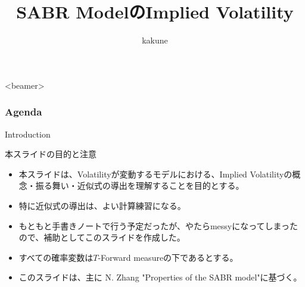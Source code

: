 \documentclass[dvipdfmx,9pt]{beamer}
\title{SABR ModelのImplied Volatility}
\author{kakune}
\begin{document}
\begin{frame}
  \titlepage
\end{frame}

\begin{frame}<beamer>
  \frametitle{Agenda}
  \tableofcontents
\end{frame}

\begin{frame}{Introduction}
  \begin{alertblock}{本スライドの目的と注意}
    \begin{itemize}
      \item 本スライドは、Volatilityが変動するモデルにおける、Implied Volatilityの概念・振る舞い・近似式の導出を理解することを目的とする。
      \item 特に近似式の導出は、よい計算練習になる。
      \item もともと手書きノートで行う予定だったが、やたらmessyになってしまったので、補助としてこのスライドを作成した。
      \item すべての確率変数は$T$-Forward measureの下であるとする。
      \item このスライドは、主に N. Zhang "Properties of the SABR model"に基づく。
    \end{itemize}
  \end{alertblock}
\end{frame}
\end{document}
